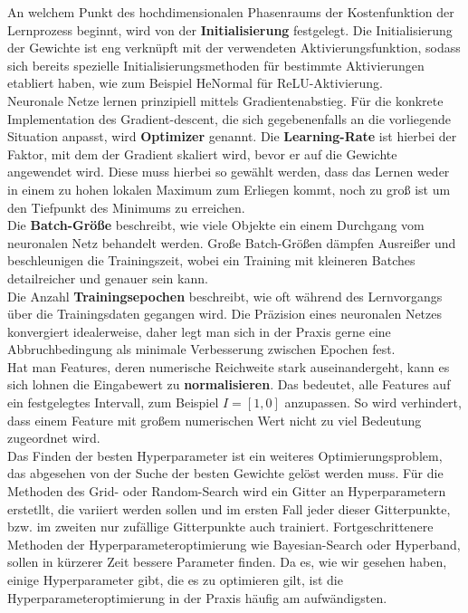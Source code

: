 \newline
An welchem Punkt des hochdimensionalen Phasenraums der Kostenfunktion der Lernprozess beginnt, wird von der \textbf{Initialisierung} festgelegt. Die Initialisierung der Gewichte ist eng verknüpft mit der verwendeten Aktivierungsfunktion, sodass sich bereits spezielle Initialisierungsmethoden für bestimmte Aktivierungen etabliert haben, wie zum Beispiel HeNormal für ReLU-Aktivierung. \\
\newline
Neuronale Netze lernen prinzipiell mittels Gradientenabstieg. Für die konkrete Implementation des Gradient-descent, die sich gegebenenfalls an die vorliegende Situation anpasst, wird \textbf{Optimizer} genannt. Die \textbf{Learning-Rate} ist hierbei der Faktor, mit dem der Gradient skaliert wird, bevor er auf die Gewichte angewendet wird. Diese muss hierbei so gewählt werden, dass das Lernen weder in einem zu hohen lokalen Maximum zum Erliegen kommt, noch zu groß ist um den Tiefpunkt des Minimums zu erreichen. \\
\newline
Die \textbf{Batch-Größe} beschreibt, wie viele Objekte ein einem Durchgang vom neuronalen Netz behandelt werden. Große Batch-Größen dämpfen Ausreißer und beschleunigen die Trainingszeit, wobei ein Training mit kleineren Batches detailreicher und genauer sein kann. \\ 
\newline
Die Anzahl \textbf{Trainingsepochen} beschreibt, wie oft während des Lernvorgangs über die Trainingsdaten gegangen wird. Die Präzision eines neuronalen Netzes konvergiert idealerweise, daher legt man sich in der Praxis gerne eine Abbruchbedingung als minimale Verbesserung zwischen Epochen fest. \\
\newline
Hat man Features, deren numerische Reichweite stark auseinandergeht, kann es sich lohnen die Eingabewert zu \textbf{normalisieren}. Das bedeutet, alle Features auf ein festgelegtes Intervall, zum Beispiel $I=[1,0]$ anzupassen. So wird verhindert, dass einem Feature mit großem numerischen Wert nicht zu viel Bedeutung zugeordnet wird.\\
\newline
Das Finden der besten Hyperparameter ist ein weiteres Optimierungsproblem, das abgesehen von der Suche der besten Gewichte gelöst werden muss. Für die Methoden des Grid- oder Random-Search wird ein Gitter an Hyperparametern erstetllt, die variiert werden sollen und im ersten Fall jeder dieser Gitterpunkte, bzw. im zweiten nur zufällige Gitterpunkte auch trainiert. Fortgeschrittenere Methoden der Hyperparameteroptimierung wie Bayesian-Search oder Hyperband, sollen in kürzerer Zeit bessere Parameter finden. Da es, wie wir gesehen haben, einige Hyperparameter gibt, die es zu optimieren gilt, ist die Hyperparameteroptimierung in der Praxis häufig am aufwändigsten.

